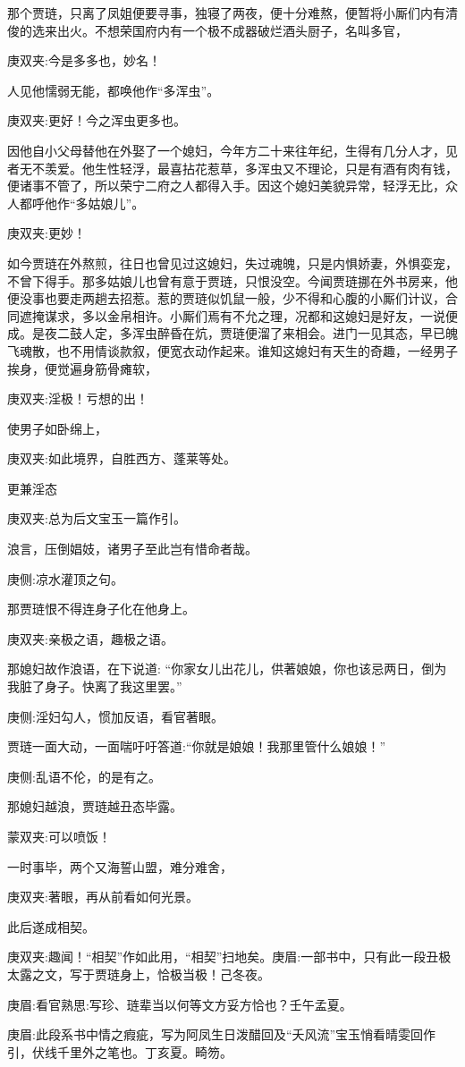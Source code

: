 \begin{parag}
    那个贾琏，只离了凤姐便要寻事，独寝了两夜，便十分难熬，便暂将小厮们内有清俊的选来出火。不想荣国府内有一个极不成器破烂酒头厨子，名叫多官，\begin{note}庚双夹:今是多多也，妙名！\end{note}人见他懦弱无能，都唤他作“多浑虫”。\begin{note}庚双夹:更好！今之浑虫更多也。\end{note}因他自小父母替他在外娶了一个媳妇，今年方二十来往年纪，生得有几分人才，见者无不羡爱。他生性轻浮，最喜拈花惹草，多浑虫又不理论，只是有酒有肉有钱，便诸事不管了，所以荣宁二府之人都得入手。因这个媳妇美貌异常，轻浮无比，众人都呼他作“多姑娘儿”。\begin{note}庚双夹:更妙！\end{note}如今贾琏在外熬煎，往日也曾见过这媳妇，失过魂魄，只是内惧娇妻，外惧娈宠，不曾下得手。那多姑娘儿也曾有意于贾琏，只恨没空。今闻贾琏挪在外书房来，他便没事也要走两趟去招惹。惹的贾琏似饥鼠一般，少不得和心腹的小厮们计议，合同遮掩谋求，多以金帛相许。小厮们焉有不允之理，况都和这媳妇是好友，一说便成。是夜二鼓人定，多浑虫醉昏在炕，贾琏便溜了来相会。进门一见其态，早已魄飞魂散，也不用情谈款叙，便宽衣动作起来。谁知这媳妇有天生的奇趣，一经男子挨身，便觉遍身筋骨瘫软，\begin{note}庚双夹:淫极！亏想的出！\end{note}使男子如卧绵上，\begin{note}庚双夹:如此境界，自胜西方、蓬莱等处。\end{note}更兼淫态\begin{note}庚双夹:总为后文宝玉一篇作引。\end{note}浪言，压倒娼妓，诸男子至此岂有惜命者哉。\begin{note}庚侧:凉水灌顶之句。\end{note}那贾琏恨不得连身子化在他身上。\begin{note}庚双夹:亲极之语，趣极之语。\end{note}那媳妇故作浪语，在下说道: “你家女儿出花儿，供著娘娘，你也该忌两日，倒为我脏了身子。快离了我这里罢。”\begin{note}庚侧:淫妇勾人，惯加反语，看官著眼。\end{note}贾琏一面大动，一面喘吁吁答道:“你就是娘娘！我那里管什么娘娘！”\begin{note}庚侧:乱语不伦，的是有之。\end{note}那媳妇越浪，贾琏越丑态毕露。\begin{note}蒙双夹:可以喷饭！\end{note}一时事毕，两个又海誓山盟，难分难舍，\begin{note}庚双夹:著眼，再从前看如何光景。\end{note}此后遂成相契。\begin{note}庚双夹:趣闻！“相契”作如此用，“相契”扫地矣。庚眉:一部书中，只有此一段丑极太露之文，写于贾琏身上，恰极当极！己冬夜。\end{note}\begin{note}庚眉:看官熟思:写珍、琏辈当以何等文方妥方恰也？壬午孟夏。\end{note}\begin{note}庚眉:此段系书中情之瘕疵，写为阿凤生日泼醋回及“夭风流”宝玉悄看晴雯回作引，伏线千里外之笔也。丁亥夏。畸笏。\end{note}

\end{parag}
